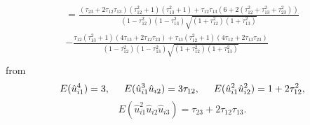 \documentclass[aoas,preprint]{imsart}
\numberwithin{equation}{section}
\theoremstyle{plain}
\begin{document}
\begin{equation} \begin{multlined}
= \frac{(\tau_{23}+2\tau_{12}\tau_{13})(\tau_{12}^2+1)(\tau_{13}^2+1) + \tau_{12}\tau_{13}(6+2(\tau_{12}^2+\tau_{13}^2+\tau_{23}^2))}{(1-{\tau}_{12}^2)(1-{\tau}_{13}^2)\sqrt{(1+{\tau}_{12}^2)(1+{\tau}_{13}^2)}} \\
- \frac{\tau_{12}(\tau_{13}^2+1)(4\tau_{13}+2\tau_{12}\tau_{23}) + \tau_{13}(\tau_{12}^2+1)(4\tau_{12}+2\tau_{13}\tau_{23})}{(1-{\tau}_{12}^2)(1-{\tau}_{13}^2)\sqrt{(1+{\tau}_{12}^2)(1+{\tau}_{13}^2)}}\\
\end{multlined} \end{equation}
from
$$E(\hat{u}_{i1}^4) = 3, \hspace{5mm} E(\hat{u}_{i1}^3 \hat{u}_{i2}) = 3\tau_{12}, \hspace{5mm} E(\hat{u}_{i1}^2\hat{u}_{i2}^2) = 1 + 2\tau_{12}^2,$$
$$E(\hat{u}_{i1}^2 \hat{u}_{i2} \hat{u}_{i3}) = \tau_{23} + 2\tau_{12}\tau_{13}.$$
\end{document}
